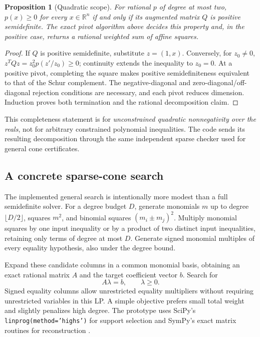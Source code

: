 \documentclass[11pt,letterpaper]{article}
\newcommand{\code}[1]{\texttt{#1}}
\newcommand{\R}{\mathbb{R}}\newcommand{\Z}{\mathbb{Z}}\newcommand{\Q}{\mathbb{Q}}\newcommand{\N}{\mathbb{N}}
\newtheorem{proposition}[theorem]{Proposition}
\theoremstyle{definition}\newtheorem{definition}[theorem]{Definition}
\theoremstyle{remark}\newtheorem{remark}[theorem]{Remark}
\begin{document}
\begin{proposition}[Quadratic scope]
For rational $p$ of degree at most two, $p(x)\ge0$ for every $x\in\R^n$ if and only if its augmented matrix $Q$ is positive semidefinite. The exact pivot algorithm above decides this property and, in the positive case, returns a rational weighted sum of affine squares.
\end{proposition}
\begin{proof}
If $Q$ is positive semidefinite, substitute $z=(1,x)$. Conversely, for $z_0\ne0$,
$z^TQz=z_0^2p(z'/z_0)\ge0$; continuity extends the inequality to $z_0=0$. At a positive pivot, completing the square makes positive semidefiniteness equivalent to that of the Schur complement. The negative-diagonal and zero-diagonal/off-diagonal rejection conditions are necessary, and each pivot reduces dimension. Induction proves both termination and the rational decomposition claim.
\end{proof}
This completeness statement is for \emph{unconstrained quadratic nonnegativity over the reals}, not for arbitrary constrained polynomial inequalities. The code sends its resulting decomposition through the same independent sparse checker used for general cone certificates.

\subsection{A concrete sparse-cone search}
The implemented general search is intentionally more modest than a full semidefinite solver. For a degree budget $D$, generate monomials $m$ up to degree $\lfloor D/2\rfloor$, squares $m^2$, and binomial squares $(m_i\pm m_j)^2$. Multiply monomial squares by one input inequality or by a product of two distinct input inequalities, retaining only terms of degree at most $D$. Generate signed monomial multiples of every equality hypothesis, also under the degree bound.

Expand these candidate columns in a common monomial basis, obtaining an exact rational matrix $A$ and the target coefficient vector $b$. Search for
\[
 A\lambda=b,\qquad \lambda\ge0.
\]
Signed equality columns allow unrestricted equality multipliers without requiring unrestricted variables in this LP. A simple objective prefers small total weight and slightly penalizes high degree. The prototype uses SciPy's \code{linprog(method='highs')} for support selection and SymPy's exact matrix routines for reconstruction \cite{scipy,sympy}.
\end{document}
